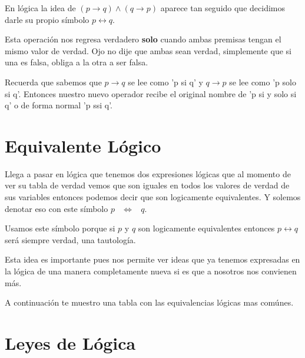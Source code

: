 \documentclass[12pt, fleqn]{report}                             %
\DeclareMathOperator \Space {\quad}                             %
\DeclareMathOperator \MiniSpace {\;}                            %
\DeclareMathOperator \doublearrow {\leftrightarrow}             %
\newcommand \lequal {\MiniSpace \Leftrightarrow \MiniSpace}     %
\begin{document}
                En lógica la idea de $(p \to q ) \land (q \to p)$ aparece tan seguido que decidimos darle su
                propio símbolo $p \doublearrow q$.

                Esta operación nos regresa verdadero \textbf{solo} cuando ambas premisas tengan el mismo valor de
                verdad. Ojo no dije que ambas sean verdad, simplemente que si una es falsa, obliga a la otra a 
                ser falsa.

                Recuerda que sabemos que $p \to q$ se lee como 'p si q' y $q \to p$ se lee como 'p solo si q'.
                Entonces nuestro nuevo operador recibe el original nombre de 'p si y solo si q' o de forma normal
                'p ssi q'.



        \section{Equivalente Lógico}

            Llega a pasar en lógica que tenemos dos expresiones lógicas que al momento de ver su tabla de 
            verdad vemos que son iguales en todos los valores de verdad de sus variables entonces podemos
            decir que son logicamente equivalentes. Y solemos denotar eso con este símbolo $p \lequal q$.

            Usamos este símbolo porque si $p$ y $q$ son logicamente equivalentes entonces $p \doublearrow q$
            será siempre verdad, una tautología.

            Esta idea es importante pues nos permite ver ideas que ya tenemos expresadas en la lógica de una
            manera completamente nueva si es que a nosotros nos convienen más.

            A continuación te muestro una tabla con las equivalencias lógicas mas comúnes.






        \clearpage
        \section{Leyes de Lógica}
                    
\end{document}
